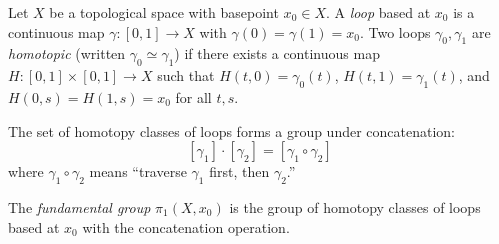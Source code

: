 \begin{definition}
Let $X$ be a topological space with basepoint $x_0 \in X$. A \textit{loop} based at $x_0$ is a continuous map $\gamma: [0, 1] \to X$ with $\gamma(0) = \gamma(1) = x_0$. Two loops $\gamma_0, \gamma_1$ are \textit{homotopic} (written $\gamma_0 \simeq \gamma_1$) if there exists a continuous map $H: [0, 1] \times [0, 1] \to X$ such that $H(t, 0) = \gamma_0(t)$, $H(t, 1) = \gamma_1(t)$, and $H(0, s) = H(1, s) = x_0$ for all $t, s$.
\end{definition}

The set of homotopy classes of loops forms a group under concatenation:
\[
[\gamma_1] \cdot [\gamma_2] = [\gamma_1 \circ \gamma_2]
\]
where $\gamma_1 \circ \gamma_2$ means ``traverse $\gamma_1$ first, then $\gamma_2$.''

\begin{definition}
The \textit{fundamental group} $\pi_1(X, x_0)$ is the group of homotopy classes of loops based at $x_0$ with the concatenation operation.
\end{definition}

